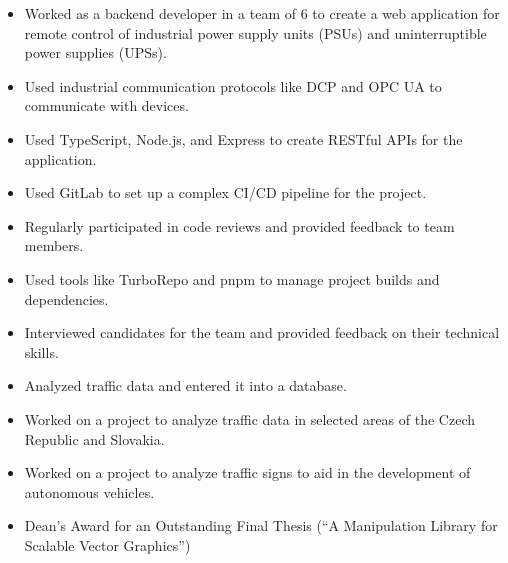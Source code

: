 \documentclass[10pt,a4paper,ragged2e,withhyper]{altacv}
\begin{document}


\makecvheader
\vspace{1cm}

\begin{paracol}{2}

	\begin{itemize}
		\item Worked as a backend developer in a team of 6 to create a web application for remote control of industrial power supply units (PSUs) and uninterruptible power supplies (UPSs).
		\item Used industrial communication protocols like DCP and OPC UA to communicate with devices.
		\item Used TypeScript, Node.js, and Express to create RESTful APIs for the application.
		\item Used GitLab to set up a complex CI/CD pipeline for the project.
		\item Regularly participated in code reviews and provided feedback to team members.
		\item Used tools like TurboRepo and pnpm to manage project builds and dependencies.
		\item Interviewed candidates for the team and provided feedback on their technical skills.
	\end{itemize}

	\divider

	\begin{itemize}
		\item Analyzed traffic data and entered it into a database.
		\item Worked on a project to analyze traffic data in selected areas of the Czech Republic and Slovakia.
		\item Worked on a project to analyze traffic signs to aid in the development of autonomous vehicles.
	\end{itemize}


	\begin{itemize}
		\item Dean's Award for an Outstanding Final Thesis (\enquote{A Manipulation Library for Scalable Vector Graphics})
	\end{itemize}


\end{paracol}
\end{document}
